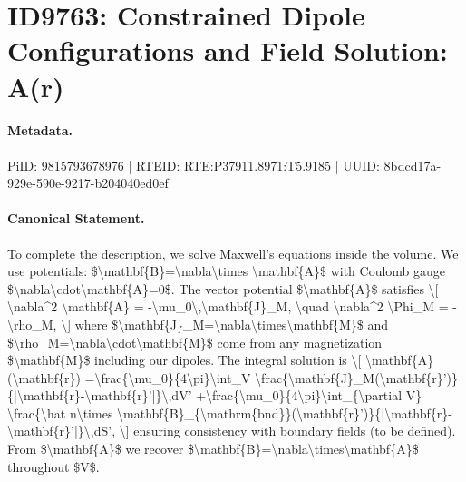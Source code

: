 \section*{ID9763: Constrained Dipole Configurations and Field Solution: A(r)}
\paragraph{Metadata.}
PiID: 9815793678976 | RTEID: RTE:P37911.8971:T5.9185 | UUID: 8bdcd17a-929e-590e-9217-b204040ed0ef

\paragraph{Canonical Statement.}
To complete the description, we solve Maxwell's equations inside the volume. We use potentials: \$\textbackslash{}mathbf\{B\}=\textbackslash{}nabla\textbackslash{}times \textbackslash{}mathbf\{A\}\$ with Coulomb gauge \$\textbackslash{}nabla\textbackslash{}cdot\textbackslash{}mathbf\{A\}=0\$. The vector potential \$\textbackslash{}mathbf\{A\}\$ satisfies \textbackslash{}[ \textbackslash{}nabla\textasciicircum{}2 \textbackslash{}mathbf\{A\} = -\textbackslash{}mu\_0\textbackslash{},\textbackslash{}mathbf\{J\}\_M, \textbackslash{}quad \textbackslash{}nabla\textasciicircum{}2 \textbackslash{}Phi\_M = -\textbackslash{}rho\_M, \textbackslash{}] where \$\textbackslash{}mathbf\{J\}\_M=\textbackslash{}nabla\textbackslash{}times\textbackslash{}mathbf\{M\}\$ and \$\textbackslash{}rho\_M=\textbackslash{}nabla\textbackslash{}cdot\textbackslash{}mathbf\{M\}\$ come from any magnetization \$\textbackslash{}mathbf\{M\}\$ including our dipoles. The integral solution is \textbackslash{}[ \textbackslash{}mathbf\{A\}(\textbackslash{}mathbf\{r\}) =\textbackslash{}frac\{\textbackslash{}mu\_0\}\{4\textbackslash{}pi\}\textbackslash{}int\_V \textbackslash{}frac\{\textbackslash{}mathbf\{J\}\_M(\textbackslash{}mathbf\{r\}')\}\{|\textbackslash{}mathbf\{r\}-\textbackslash{}mathbf\{r\}'|\}\textbackslash{},dV' +\textbackslash{}frac\{\textbackslash{}mu\_0\}\{4\textbackslash{}pi\}\textbackslash{}int\_\{\textbackslash{}partial V\} \textbackslash{}frac\{\textbackslash{}hat n\textbackslash{}times \textbackslash{}mathbf\{B\}\_\{\textbackslash{}mathrm\{bnd\}\}(\textbackslash{}mathbf\{r\}')\}\{|\textbackslash{}mathbf\{r\}-\textbackslash{}mathbf\{r\}'|\}\textbackslash{},dS', \textbackslash{}] ensuring consistency with boundary fields (to be defined). From \$\textbackslash{}mathbf\{A\}\$ we recover \$\textbackslash{}mathbf\{B\}=\textbackslash{}nabla\textbackslash{}times\textbackslash{}mathbf\{A\}\$ throughout \$V\$.


